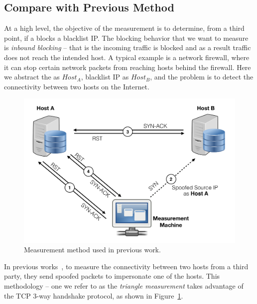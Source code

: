 \subsection{Compare with Previous Method}

At a high level, the objective of the measurement is to determine, from a third
point, if a {} blocks a blacklist IP. The blocking behavior that we
want to measure is \textit{inbound blocking} -- that is the incoming traffic
is blocked and as a result traffic does not reach the intended host. A
typical example is a network firewall, where it can stop certain network
packets from reaching hosts behind the firewall. Here we abstract the
{} as $Host_A$, blacklist IP as $Host_B$, and the problem is to
detect the connectivity between two hosts on the Internet.


\begin{figure}[t]
\centering
\includegraphics[width=0.8\columnwidth]{data_usage/images/croped_method_old.pdf}
\caption{Measurement method used in previous work.}
\label{fig:old_method}
\end{figure}

In previous works~\cite{pearce2017augur, ensafi2014detecting}, to measure
the connectivity between two hosts from a third party, they send spoofed packets
to impersonate one of the hosts. This methodology -- one we refer
to as the \textit{triangle measurement} takes advantage of the TCP 3-way
handshake protocol, as shown in Figure~\ref{fig:old_method}.

